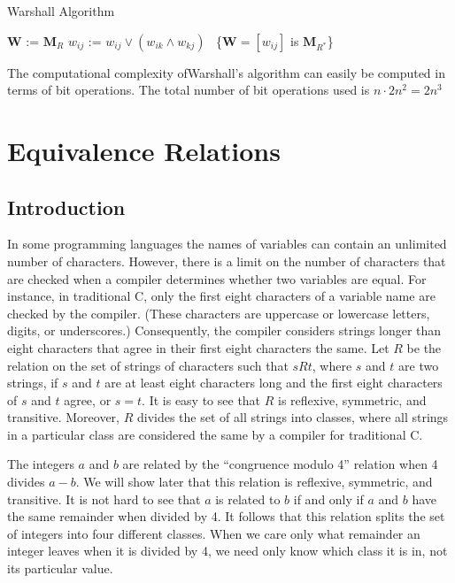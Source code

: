 \documentclass[11pt]{article}
\begin{document}
\begin{algorithm}
\caption{Warshall Algorithm}
\begin{algorithmic}
\State $\mathbf{W}$ := $\mathbf{M}_R$
\State $w_{ij}$ := $w_{ij} \lor (w_{ik} \land w_{kj})$
\EndFor
\EndFor
\EndFor
\State {}\ \{$\mathbf{W} = [w_{ij}]$ is $\mathbf{M}_{R^*}$\}
\EndProcedure
\end{algorithmic}
\end{algorithm}

The computational complexity ofWarshall’s algorithm can easily be computed in terms of bit operations. The total number of bit operations used is $n \cdot 2n^2 = 2n^3$

\section{Equivalence Relations}

\subsection{Introduction}

In some programming languages the names of variables can contain an unlimited number of characters. However, there is a limit on the number of characters that are checked when a compiler determines whether two variables are equal. For instance, in traditional C, only the first eight characters of a variable name are checked by the compiler. (These characters are uppercase or lowercase letters, digits, or underscores.) Consequently, the compiler considers strings longer than eight characters that agree in their first eight characters the same. Let $R$ be the relation on the set of strings of characters such that $s R t$, where $s$ and $t$ are two strings, if $s$ and $t$ are at least eight characters long and the first eight characters of $s$ and $t$ agree, or $s = t$. It is easy to see that $R$ is reflexive, symmetric, and transitive. Moreover, $R$ divides the set of all strings into classes, where all strings in a particular class are considered the same by a compiler for traditional C.

The integers $a$ and $b$ are related by the “congruence modulo 4” relation when 4 divides $a-b$. We will show later that this relation is reflexive, symmetric, and transitive. It is not hard to see that $a$ is related to $b$ if and only if $a$ and $b$ have the same remainder when divided by 4. It follows that this relation splits the set of integers into four different classes. When we care only what remainder an integer leaves when it is divided by 4, we need only know which class it is in, not its particular value.
\end{document}
